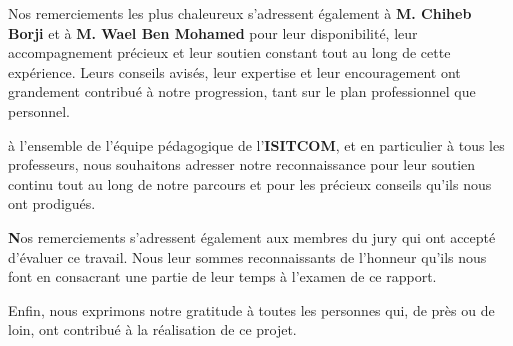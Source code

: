 \vspace{1em}
\newpage
Nos remerciements les plus chaleureux s'adressent également à \textbf{M. Chiheb Borji}  et à \textbf {M. Wael Ben Mohamed} pour leur disponibilité, leur accompagnement précieux et leur soutien constant tout au long de cette expérience. Leurs conseils avisés, leur expertise et leur encouragement ont grandement contribué à notre progression, tant sur le plan professionnel que personnel.

\vspace{1em}


à l'ensemble de l'équipe pédagogique de l'\textbf{ISITCOM}, et en particulier à tous les professeurs, nous souhaitons adresser notre reconnaissance pour leur soutien continu tout au long de notre parcours et pour les précieux conseils qu'ils nous ont prodigués.

\vspace{1em}

\textbf Nos remerciements s'adressent également {aux membres du jury} qui ont accepté d'évaluer ce travail. Nous leur sommes reconnaissants de l'honneur qu'ils nous font en consacrant une partie de leur temps à l'examen de ce rapport.

\vspace{1em}

Enfin, nous exprimons notre gratitude à toutes les personnes qui, de près ou de loin, ont contribué à la réalisation de ce projet.

